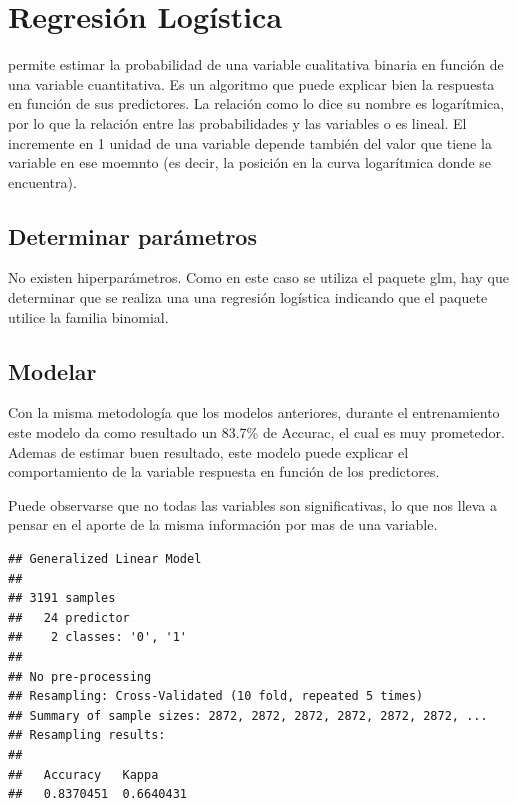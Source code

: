 \documentclass[]{article}
\begin{document}
\hypertarget{regresiuxf3n-loguxedstica}{%
\section{Regresión Logística}\label{regresiuxf3n-loguxedstica}}

permite estimar la probabilidad de una variable cualitativa binaria en
función de una variable cuantitativa. Es un algoritmo que puede explicar
bien la respuesta en función de sus predictores. La relación como lo
dice su nombre es logarítmica, por lo que la relación entre las
probabilidades y las variables o es lineal. El incremente en 1 unidad de
una variable depende también del valor que tiene la variable en ese
moemnto (es decir, la posición en la curva logarítmica donde se
encuentra).

\hypertarget{determinar-paruxe1metros}{%
\subsection{Determinar parámetros}\label{determinar-paruxe1metros}}

No existen hiperparámetros. Como en este caso se utiliza el paquete glm,
hay que determinar que se realiza una una regresión logística indicando
que el paquete utilice la familia binomial.

\hypertarget{modelar-2}{%
\subsection{Modelar}\label{modelar-2}}

Con la misma metodología que los modelos anteriores, durante el
entrenamiento este modelo da como resultado un 83.7\% de Accurac, el
cual es muy prometedor. Ademas de estimar buen resultado, este modelo
puede explicar el comportamiento de la variable respuesta en función de
los predictores.

Puede observarse que no todas las variables son significativas, lo que
nos lleva a pensar en el aporte de la misma información por mas de una
variable.

\begin{lstlisting}
## Generalized Linear Model 
## 
## 3191 samples
##   24 predictor
##    2 classes: '0', '1' 
## 
## No pre-processing
## Resampling: Cross-Validated (10 fold, repeated 5 times) 
## Summary of sample sizes: 2872, 2872, 2872, 2872, 2872, 2872, ... 
## Resampling results:
## 
##   Accuracy   Kappa    
##   0.8370451  0.6640431
\end{lstlisting}
\end{document}
